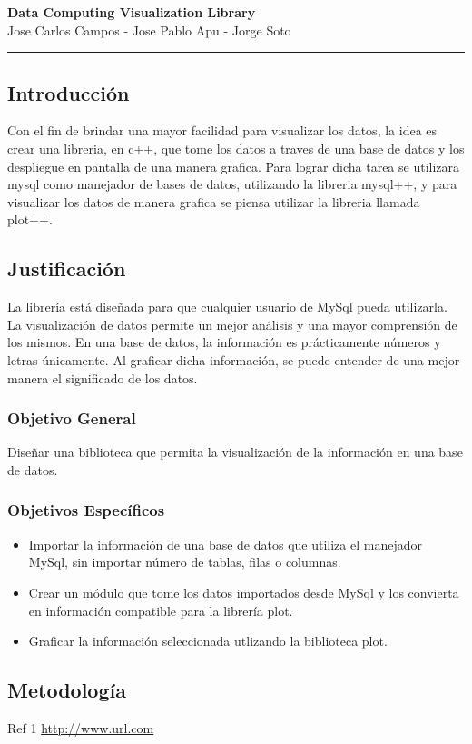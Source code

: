 \documentclass[11pt]{article}
\begin{document}
\begin{center}
{ \huge \bfseries Data Computing Visualization Library }\\[0.2cm]
{ Jose Carlos Campos - Jose Pablo Apu - Jorge Soto }\\[0.2cm]
\rule{\linewidth}{0.25mm}
\end{center}

\subsection*{Introducción}
Con el fin de brindar una mayor facilidad para visualizar los datos, la idea es crear una libreria, en c++, que tome los datos a traves de una base de datos y los despliegue en pantalla de una manera grafica. Para lograr dicha tarea se utilizara mysql como manejador de bases de datos, utilizando la libreria mysql++, y para visualizar los datos de manera grafica se piensa utilizar la libreria llamada plot++. 

\subsection*{Justificación}
La librería está diseñada para que cualquier usuario de MySql pueda utilizarla. La visualización de datos permite un mejor análisis y una mayor comprensión de los mismos. En una base de datos, la información es prácticamente números y letras únicamente. Al graficar dicha información, se puede entender de una mejor manera el significado de los datos.

\subsubsection*{Objetivo General}
Diseñar una biblioteca que permita la visualización  de la información en una base de datos.

\subsubsection*{Objetivos Específicos}
\begin{itemize}
\item Importar la información de una base de datos que utiliza el manejador MySql, sin importar número de tablas, filas o columnas.
\item Crear un módulo que tome los datos importados desde MySql y los convierta en información compatible para la librería plot.
\item Graficar la información seleccionada utlizando la biblioteca plot.
\end{itemize}
\subsection*{Metodología}

\begin{thebibliography}{10}
Ref 1
\url{http://www.url.com}
\end{thebibliography}
\end{document}
